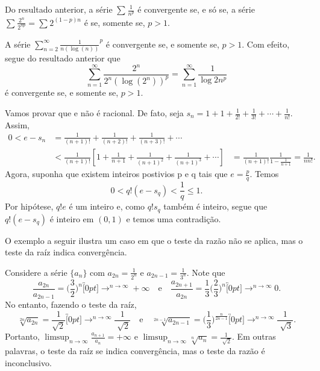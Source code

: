 \documentclass[analysis_notes.tex]{subfiles}
\begin{document}
\begin{example}
	Do resultado anterior, a s\'erie $\sum\limits_{}^{}\frac{1}{n^{p}}$ \'e convergente se, e s\'o se, a s\'erie $\sum\limits_{}^{}\frac{2^{n}}{2^{np}} = \sum\limits_{}^{}2^{(1-p)n}$ \'e
	se, somente se, $p>1.$
\end{example}
\begin{example}
	A s\'erie $\sum\limits_{n=2}^{\infty}\frac{1}{n(\log{(n)})}^{p}$ \'e convergente se, e somente se, $p>1.$ Com efeito, segue do resultado anterior que
	$$
		\sum\limits_{n=1}^{\infty}\frac{2^{n}}{2^{n}(\log{(2^{n})})^{p}} = \sum\limits_{n=1}^{\infty}\frac{1}{\log{2}n^{p}}
	$$
	\'e convergente se, e somente se, $p>1$.
\end{example}
\begin{example}
	Vamos provar que e n\~ao \'e racional. De fato, seja $s_{n} = 1 + 1 + \frac{1}{2!} + \frac{1}{3!} + \cdots + \frac{1}{n!}.$ Assim,
	\begin{align*}
		0 < e - s_{n} & = \frac{1}{(n+1)!}+\frac{1}{(n+2)!} + \frac{1}{(n+3)!} + \cdots                     \\
		              & < \frac{1}{(n+1)!}[1+\frac{1}{n+1}+\frac{1}{(n+1)^{2}}+ \frac{1}{(n+1)^{3}}+\cdots]
		              & = \frac{1}{(n+1)!}\frac{1}{1-\frac{1}{n+1}} = \frac{1}{nn!}.
	\end{align*}
	Agora, suponha que existem inteiros postivios p e q tais que $e = \frac{p}{q}$. Temos
	$$
		0 < q!(e-s_{q})<\frac{1}{q}\leq{1}.
	$$
	Por hip\'otese, $q!e$ \'e um inteiro e, como $q!s_{q}$ tamb\'em \'e inteiro, segue que $q!(e-s_{q})$ \'e inteiro em $(0,1)$ e temos
	uma contradi\c c\~ao.
\end{example}
O exemplo a seguir ilustra um caso em que o teste da raz\~ao n\~ao se aplica, mas o teste da ra\'iz indica converg\^encia.
\begin{example}
	Considere a s\'erie $\{a_{n}\}$ com $a_{2n} = \frac{1}{2^{n}}$ e $a_{2n-1}= \frac{1}{3^{n}}.$ Note que
	$$
		\frac{a_{2n}}{a_{2n-1}} = \biggl(\frac{3}{2}\biggr)^{n}\overbracket[0pt]{\longrightarrow}^{n\to \infty}+\infty\quad\text{e}\quad \frac{a_{2n+1}}{a_{2n}} = \frac{1}{3}\biggl(\frac{2}{3}\biggr)^{n}\overbracket[0pt]{\longrightarrow}^{n\to \infty}0.
	$$
	No entanto, fazendo o teste da ra\'iz,
	$$
		\sqrt[2n]{a_{2n}} = \frac{1}{\sqrt{2}}\overbracket[0pt]{\longrightarrow}^{n\to \infty}\frac{1}{\sqrt[]{2}}\quad\text{e}\quad \sqrt[2n-1]{a_{2n-1}}=\biggl(\frac{1}{3}\biggr)^{\frac{n}{2n-1}}\overbracket[0pt]{\longrightarrow}^{n\to \infty}\frac{1}{\sqrt[]{3}}.
	$$
	Portanto, $\limsup_{n\to\infty}\frac{a_{n+1}}{a_{n}} = +\infty$ e $\limsup_{n\to\infty}\sqrt[n]{a_{n}} = \frac{1}{\sqrt[]{2}}$. Em outras palavras,
	o teste da ra\'iz se indica converg\^encia, mas o teste da raz\~ao \'e inconclusivo. \qedsymbol
\end{example}
\end{document}
